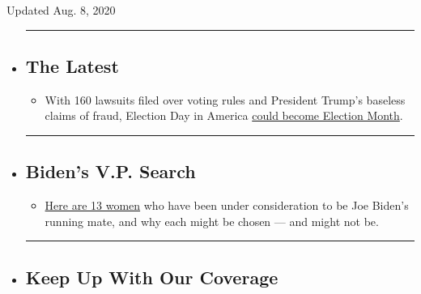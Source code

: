 Updated Aug. 8, 2020

\begin{itemize}
\item
  \begin{center}\rule{0.5\linewidth}{\linethickness}\end{center}

  \hypertarget{the-latest}{%
  \subsection{The Latest}\label{the-latest}}

  \begin{itemize}
  \tightlist
  \item
    With 160 lawsuits filed over voting rules and President Trump's
    baseless claims of fraud, Election Day in America
    \href{https://www.nytimes.com/2020/08/08/us/politics/voting-nov-3-election.html?action=click\&pgtype=Article\&state=default\&region=BELOW_MAIN_CONTENT\&context=storylines_guide}{could
    become Election Month}.
  \end{itemize}
\item
  \begin{center}\rule{0.5\linewidth}{\linethickness}\end{center}

  \hypertarget{bidens-vp-search}{%
  \subsection{Biden's V.P. Search}\label{bidens-vp-search}}

  \begin{itemize}
  \tightlist
  \item
    \href{https://www.nytimes.com/article/biden-vice-president-2020.html?action=click\&pgtype=Article\&state=default\&region=BELOW_MAIN_CONTENT\&context=storylines_guide}{Here
    are 13 women} who have been under consideration to be Joe Biden's
    running mate, and why each might be chosen --- and might not be.
  \end{itemize}
\item
  \begin{center}\rule{0.5\linewidth}{\linethickness}\end{center}

  \hypertarget{keep-up-with-our-coverage}{%
  \subsection{Keep Up With Our
  Coverage}\label{keep-up-with-our-coverage}}


\end{itemize}
